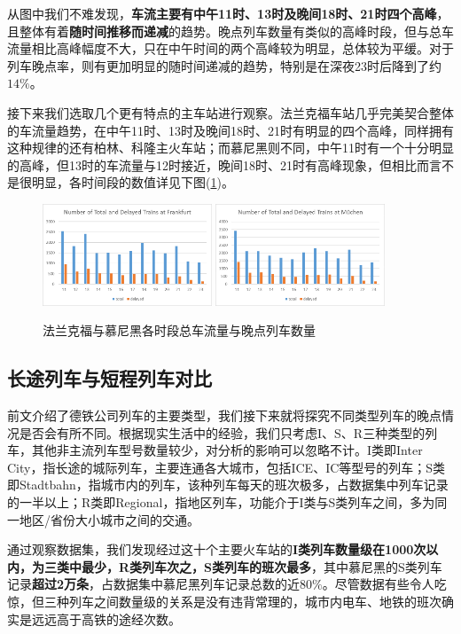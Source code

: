 \documentclass[lang=cn,12pt,a4paper,cite=authoryear]{elegantpaper}
\begin{document}
从图中我们不难发现，\textbf{车流主要有中午11时、13时及晚间18时、21时四个高峰}，且整体有着\textbf{随时间推移而递减}的趋势。晚点列车数量有类似的高峰时段，但与总车流量相比高峰幅度不大，只在中午时间的两个高峰较为明显，总体较为平缓。对于列车晚点率，则有更加明显的随时间递减的趋势，特别是在深夜23时后降到了约$14\%$。

接下来我们选取几个更有特点的主车站进行观察。法兰克福车站几乎完美契合整体的车流量趋势，在中午11时、13时及晚间18时、21时有明显的四个高峰，同样拥有这种规律的还有柏林、科隆主火车站；而慕尼黑则不同，中午11时有一个十分明显的高峰，但13时的车流量与12时接近，晚间18时、21时有高峰现象，但相比而言不是很明显，各时间段的数值详见下图(\ref{fig5})。

\begin{figure}[H]
	\centering
	\includegraphics[width=0.45\textwidth]{image/frankfurt.png}
	\quad
	\includegraphics[width=0.45\textwidth]{image/muechen.png}
	\caption{法兰克福与慕尼黑各时段总车流量与晚点列车数量}
	\label{fig5}
\end{figure}


\subsection{长途列车与短程列车对比}

前文介绍了德铁公司列车的主要类型，我们接下来就将探究不同类型列车的晚点情况是否会有所不同。根据现实生活中的经验，我们只考虑I、S、R三种类型的列车，其他非主流列车型号数量较少，对分析的影响可以忽略不计。I类即Inter City，指长途的城际列车，主要连通各大城市，包括ICE、IC等型号的列车；S类即Stadtbahn，指城市内的列车，该种列车每天的班次极多，占数据集中列车记录的一半以上；R类即Regional，指地区列车，功能介于I类与S类列车之间，多为同一地区/省份大小城市之间的交通。

通过观察数据集，我们发现经过这十个主要火车站的\textbf{I类列车数量级在1000次以内，为三类中最少，R类列车次之，S类列车的班次最多}，其中慕尼黑的S类列车记录\textbf{超过2万条}，占数据集中慕尼黑列车记录总数的近$80\%$。尽管数据有些令人吃惊，但三种列车之间数量级的关系是没有违背常理的，城市内电车、地铁的班次确实是远远高于高铁的途经次数。
\end{document}
